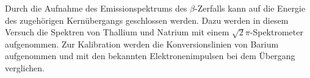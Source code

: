 Durch die Aufnahme des Emissionspektrums des $\beta$-Zerfalls kann auf die Energie des zugehörigen Kernübergangs geschlossen werden. Dazu werden in diesem Versuch die Spektren von Thallium und Natrium mit einem $\sqrt{2}\pi$-Spektrometer aufgenommen. Zur Kalibration werden die Konversionslinien von Barium aufgenommen und mit den bekannten Elektronenimpulsen bei dem Übergang verglichen.
